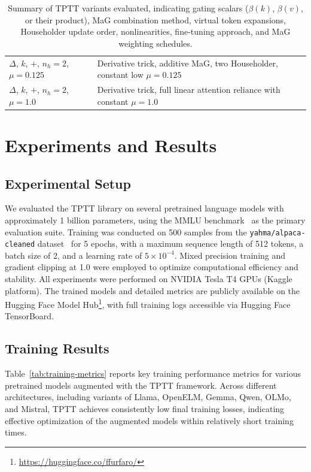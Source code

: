 \documentclass[10pt,a4paper]{article}
\begin{document}
\begin{table}[ht]
\begin{tabular}{|l|p{11cm}|}
$\Delta$, $k$, $+$, $n_h=2$, $\mu=0.125$ & Derivative trick, additive MaG, two Householder, constant low \(\mu=0.125\) \\
$\Delta$, $k$, $+$, $n_h=2$, $\mu=1.0$ & Derivative trick, full linear attention reliance with constant \(\mu=1.0\) \\
\hline
\end{tabular}
\caption{Summary of TPTT variants evaluated, indicating gating scalars (\(\beta(k)\), \(\beta(v)\), or their product), MaG combination method, virtual token expansions, Householder update order, nonlinearities, fine-tuning approach, and MaG weighting schedules.}
\label{tab:variant_parameters}
\end{table}

\section{Experiments and Results}

\subsection{Experimental Setup}

We evaluated the TPTT library on several pretrained language models with approximately 1 billion parameters, using the MMLU benchmark~\cite{hendrycks2020measuring} as the primary evaluation suite. Training was conducted on 500 samples from the \texttt{yahma/alpaca-cleaned} dataset~\cite{taori2023alpaca} for 5 epochs, with a maximum sequence length of 512 tokens, a batch size of 2, and a learning rate of $5 \times 10^{-4}$. Mixed precision training and gradient clipping at 1.0 were employed to optimize computational efficiency and stability. All experiments were performed on NVIDIA Tesla T4 GPUs (Kaggle platform). The trained models and detailed metrics are publicly available on the Hugging Face Model Hub\footnote{\url{https://huggingface.co/ffurfaro/}}, with full training logs accessible via Hugging Face TensorBoard.


\subsection{Training Results}

Table~\ref{tab:training-metrics} reports key training performance metrics for various pretrained models augmented with the TPTT framework. Across different architectures, including variants of Llama, OpenELM, Gemma, Qwen, OLMo, and Mistral, TPTT achieves consistently low final training losses, indicating effective optimization of the augmented models within relatively short training times.
\end{document}
